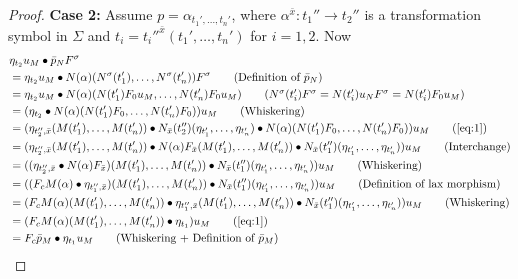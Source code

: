 \begin{proof}
   \noindent\textbf{Case 2:} Assume $p = \alpha_{t_1',\ldots, t_n'}$, where $\alpha^{\bar{x}}\colon t_1''\to t_2''$ is a transformation symbol in $\Sigma$ and $t_i = t_i''^{\bar{x}}(t_1',\ldots, t_n')$ for $i = 1,2$.
   Now
     {\small \begin{align*}
       &\eta_{t_2}u_M\bullet \bar{p}_NF^\sigma\\
       &= \eta_{t_2}u_M\bullet N(\alpha)(N^\sigma(t_1'),\ldots, N^\sigma(t_n'))F^\sigma\tag{Definition of $\bar{p}_N $}\\
       &= \eta_{t_2}u_M\bullet N(\alpha)(N(t_1')F_0u_M, \ldots, N(t_n')F_0u_M)\tag{$N^\sigma(t_i')F^\sigma = N(t_i')u_N F^\sigma = N(t_i')F_0u_M$}\\
       &= (\eta_{t_2}\bullet N(\alpha)(N(t_1')F_0,\dots, N(t_n')F_0))u_M \tag{Whiskering}\\
       &= (\eta_{t_2'',\bar{x}}(M(t_1'),\ldots, M(t_n'))\bullet N_{\bar{x}}(t_2'')(\eta_{t_1'},\ldots, \eta_{t_n'})\bullet N(\alpha)(N(t_1')F_0,\dots, N(t_n')F_0))u_M \tag{\ref{eq:1}}\\
       &= (\eta_{t_2'',\bar{x}}(M(t_1'),\ldots, M(t_n'))\bullet N(\alpha)F_{\bar{x}}(M(t_1'),\dots, M(t_n'))\bullet N_{\bar{x}}(t_1'')(\eta_{t_1'},\ldots, \eta_{t_n'}))u_M\tag{Interchange}\\
       &= ((\eta_{t_2'',\bar{x}}\bullet N(\alpha)F_{\bar{x}})(M(t_1'),\ldots, M(t_n'))\bullet N_{\bar{x}}(t_1'')(\eta_{t_1'},\ldots, \eta_{t_n'}))u_M\tag{Whiskering}\\
       &= ((F_cM(\alpha)\bullet\eta_{t_1'',\bar{x}})(M(t_1'),\ldots, M(t_n'))\bullet N_{\bar{x}}(t_1'')(\eta_{t_1'},\ldots, \eta_{t_n'}))u_M\tag{Definition of lax morphism}\\
       &= (F_cM(\alpha)(M(t_1'),\ldots, M(t_n'))\bullet \eta_{t_1'',\bar{x}}(M(t_1'),\ldots, M(t_n'))\bullet N_{\bar{x}}(t_1'')(\eta_{t_1'},\ldots, \eta_{t_n'}))u_M \tag{Whiskering}\\
       &= (F_cM(\alpha)(M(t_1'),\ldots, M(t_n'))\bullet \eta_{t_1})u_M\tag{\ref{eq:1}}\\
       &= F_c\bar{p}_M \bullet \eta_{t_1}u_M\tag{Whiskering + Definition of $\bar{p}_M$}
   \end{align*}
   }


\end{proof}
